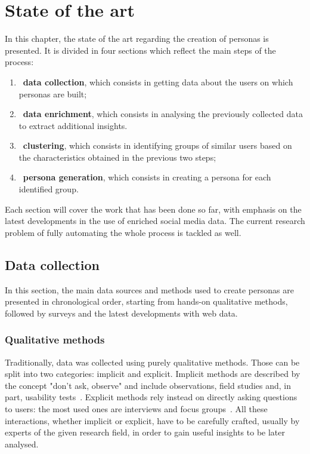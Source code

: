 \chapter{State of the art}
\label{cha:art}
In this chapter, the state of the art regarding the creation of personas is presented. It is divided in four sections which reflect the main steps of the process:
\begin{enumerate}
    \item~\textbf{data collection}, which consists in getting data about the users on which personas are built;
    \item~\textbf{data enrichment}, which consists in analysing the previously collected data to extract additional insights.
    \item~\textbf{clustering}, which consists in identifying groups of similar users based on the characteristics obtained in the previous two steps;
    \item~\textbf{persona generation}, which consists in creating a persona for each identified group.
\end{enumerate}
Each section will cover the work that has been done so far, with emphasis on the latest developments in the use of enriched social media data. The current research problem of fully automating the whole process is tackled as well.

\section{Data collection}
\label{sec:collection}
In this section, the main data sources and methods used to create personas are presented in chronological order, starting from hands-on qualitative methods, followed by surveys and the latest developments with web data.

\subsection{Qualitative methods}
\label{subsec:qualitative}
Traditionally, data was collected using purely qualitative methods. Those can be split into two categories: implicit and explicit. Implicit methods are described by the concept "don't ask, observe" and include observations, field studies and, in part, usability tests~\cite{mulder2007approaches, pruitt2003personas, olsen2004persona}. Explicit methods rely instead on directly asking questions to users: the most used ones are interviews and focus groups~\cite{mulder2007approaches, pruitt2003personas, olsen2004persona}. All these interactions, whether implicit or explicit, have to be carefully crafted, usually by experts of the given research field, in order to gain useful insights to be later analysed. 

